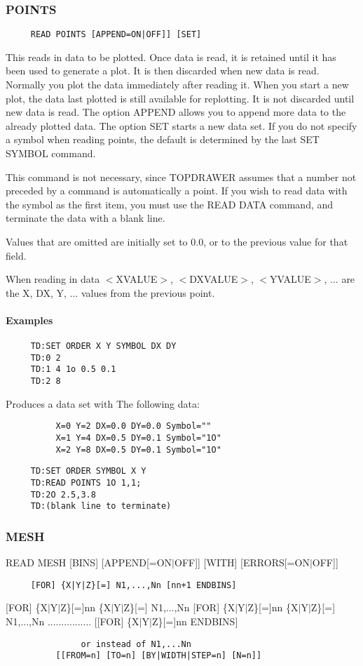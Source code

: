 \subsubsection{POINTS}
\begin{verbatim}
     READ POINTS [APPEND=ON|OFF]] [SET] 
\end{verbatim}

This  reads  in  data to be plotted.  Once data is read, it is retained
until it has been used to generate a plot.  It is then  discarded  when
new data is read.  Normally you plot the data immediately after reading
it.  When you start  a  new  plot,  the  data  last  plotted  is  still
available  for replotting.  It is not discarded until new data is read.
The option APPEND allows you to append more data to the already plotted
data.   The  option SET starts a new data set.  If you do not specify a
symbol when reading points, the default is determined by the  last  SET
SYMBOL command.  

This  command  is  not necessary, since TOPDRAWER assumes that a number
not preceded by a command is automatically a point.   If  you  wish  to
read data with the symbol as the first item, you must use the READ DATA
command, and terminate the data with a blank line.  

Values  that  are  omitted are initially set to 0.0, or to the previous
value for that field.  

When reading in data $<$XVALUE$>$, $<$DXVALUE$>$, $<$YVALUE$>$, ...  are the X, DX,
Y, ...  values from the previous point.  
\paragraph{Examples}
\begin{verbatim}
     TD:SET ORDER X Y SYMBOL DX DY 
     TD:0 2 
     TD:1 4 1o 0.5 0.1 
     TD:2 8 
\end{verbatim}
Produces a data set with The following data:  
\begin{verbatim}
          X=0 Y=2 DX=0.0 DY=0.0 Symbol="" 
          X=1 Y=4 DX=0.5 DY=0.1 Symbol="1O" 
          X=2 Y=8 DX=0.5 DY=0.1 Symbol="1O" 
\end{verbatim}

\begin{verbatim}
     TD:SET ORDER SYMBOL X Y 
     TD:READ POINTS 1O 1,1;  
     TD:2O 2.5,3.8 
     TD:(blank line to terminate) 
\end{verbatim}
\subsubsection{MESH}
READ MESH [BINS] [APPEND[=ON$|$OFF]] [WITH] [ERRORS[=ON$|$OFF]] 
\begin{verbatim}
     [FOR] {X|Y|Z}[=] N1,...,Nn [nn+1 ENDBINS] 
\end{verbatim}
[FOR] \{X$|$Y$|$Z\}[=]nn \{X$|$Y$|$Z\}[=] N1,...,Nn 
[FOR] \{X$|$Y$|$Z\}[=]nn \{X$|$Y$|$Z\}[=] N1,...,Nn 
................  
[[FOR] \{X$|$Y$|$Z\}[=]nn ENDBINS] 
\begin{verbatim}
               or instead of N1,...Nn 
          [[FROM=n] [TO=n] [BY|WIDTH|STEP=n] [N=n]] 
\end{verbatim}

